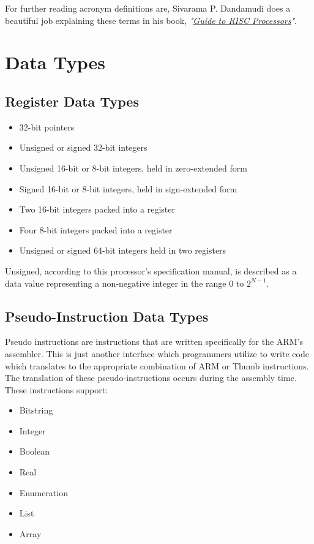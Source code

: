 \documentclass[12pt]{scrreprt}
\begin{document}
	For further reading acronym definitions are, Sivarama P. Dandamudi does a beautiful job explaining these terms in his book, \textit{"\underline{Guide to RISC Processors}"}.

{\let\clearpage\relax\chapter{Data Types}}

	\section{Register Data Types}

	\begin{itemize}
		\item{32-bit pointers}
		\item{Unsigned or signed 32-bit integers}
		\item{Unsigned 16-bit or 8-bit integers, held in zero-extended form}
		\item{Signed 16-bit or 8-bit integers, held in sign-extended form}
		\item{Two 16-bit integers packed into a register}
		\item{Four 8-bit integers packed into a register}
		\item{Unsigned or signed 64-bit integers held in two registers}
	\end{itemize}

	Unsigned, according to this processor's specification manual, is described as a data value representing a non-negative integer in the range $0$ to $2^{N-1}$.

	\section{Pseudo-Instruction Data Types}

	Pseudo instructions are instructions that are written specifically for the ARM's assembler.
	This is just another interface which programmers utilize to write code which translates to the appropriate combination of ARM or Thumb instructions.
	The translation of these pseudo-instructions occurs during the assembly time.
	These instructions support:

	\begin{itemize}
		\item{Bitstring}
		\item{Integer}
		\item{Boolean}
		\item{Real}
		\item{Enumeration}
		\item{List}
		\item{Array}
	\end{itemize}
\end{document}
